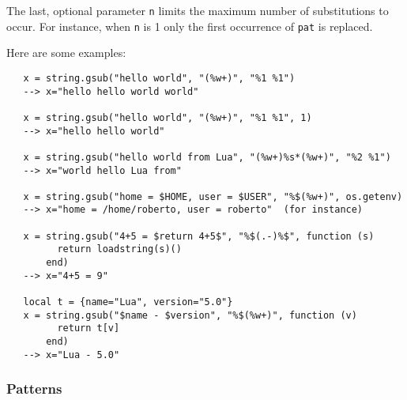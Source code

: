 \documentclass[11pt,twoside]{article}
\begin{document}
The last, optional parameter \verb|n| limits
the maximum number of substitutions to occur.
For instance, when \verb|n| is 1 only the first occurrence of
\verb|pat| is replaced.

Here are some examples:
\begin{verbatim}
   x = string.gsub("hello world", "(%w+)", "%1 %1")
   --> x="hello hello world world"

   x = string.gsub("hello world", "(%w+)", "%1 %1", 1)
   --> x="hello hello world"

   x = string.gsub("hello world from Lua", "(%w+)%s*(%w+)", "%2 %1")
   --> x="world hello Lua from"

   x = string.gsub("home = $HOME, user = $USER", "%$(%w+)", os.getenv)
   --> x="home = /home/roberto, user = roberto"  (for instance)

   x = string.gsub("4+5 = $return 4+5$", "%$(.-)%$", function (s)
         return loadstring(s)()
       end)
   --> x="4+5 = 9"

   local t = {name="Lua", version="5.0"}
   x = string.gsub("$name - $version", "%$(%w+)", function (v)
         return t[v]
       end)
   --> x="Lua - 5.0"
\end{verbatim}


\subsubsection*{Patterns} \label{pm}
\end{document}

